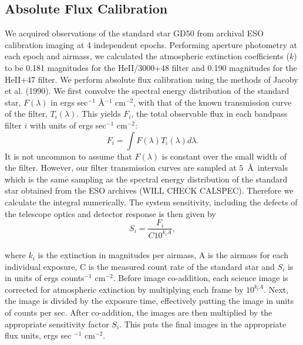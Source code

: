 \documentclass[twocolumn]{aastex61}
\begin{document}
\subsection{Absolute Flux Calibration}
We acquired observations of the standard star GD50 from archival ESO calibration imaging at 4 independent epochs. Performing aperture photometry at each epoch and airmass, we calculated the atmospheric extinction coefficients ($k$) to be 0.181 magnitudes for the HeII/3000+48 filter and 0.190 magnitudes for the HeII+47 filter. We perform absolute flux calibration using the methods of Jacoby et al. (1990). We first convolve the spectral energy distribution of the standard star, $F(\lambda)$ in ergs sec$^{-1}$ \AA$^{-1}$ cm$^{-2}$, with that of the known transmission curve of the filter, $T_{i}(\lambda)$. This yields $F_i$, the total observable flux in each bandpass filter $i$ with units of ergs sec$^{-1}$ cm$^{-2}$:
\begin{equation*}
F_{i}=\int F(\lambda)T_{i}(\lambda)d\lambda.
\end{equation*}
It is not uncommon to assume that $F(\lambda)$ is constant over the small width of the filter. However, our filter transmission curves are sampled at $5$\ \AA\ intervals which is the same sampling as the spectral energy distribution of the standard star obtained from the ESO archives (WILL CHECK CALSPEC). Therefore we calculate the integral numerically.
The system sensitivity, including the defects of the telescope optics and detector response is then given by
\begin{equation*}
S_{i}=\dfrac{F_{i}}{C10^{k_{i}A}},
\end{equation*}\\
where $k_i$ is the extinction in magnitudes per airmass, A is the airmass for each individual exposure, C is the measured count rate of the standard star and $S_i$ is in units of ergs counts$^{-1}$ cm$^{-2}$. Before image co-addition, each science image is corrected for atmospheric extinction by multiplying each frame by $10^{k_{i}A}$. Next, the image is divided by the exposure time, effectively putting the image in units of counts per sec. After co-addition, the images are then multiplied by the appropriate sensitivity factor $S_{i}$. This puts the final images in the appropriate flux units, ergs sec $^{-1}$ cm$^{-2}$.
\end{document}
